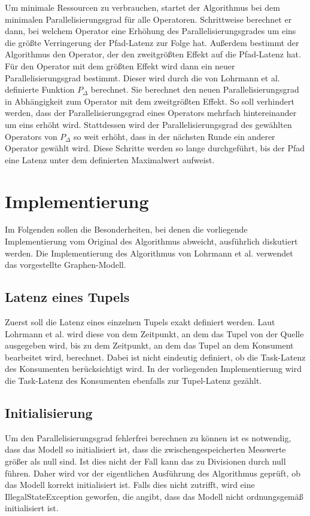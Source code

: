 Um minimale Ressourcen zu verbrauchen, startet der Algorithmus bei dem minimalen Parallelisierungsgrad für alle Operatoren.
Schrittweise berechnet er dann, bei welchem Operator eine Erhöhung des Parallelisierungsgrades um eins die größte Verringerung der Pfad-Latenz zur Folge hat.
Außerdem bestimmt der Algorithmus den Operator, der den zweitgrößten Effekt auf die Pfad-Latenz hat.
Für den Operator mit dem größten Effekt wird dann ein neuer Parallelisierungsgrad bestimmt.
Dieser wird durch die von Lohrmann et al. definierte Funktion \(P_\Delta\) berechnet.
Sie berechnet den neuen Parallelisierungsgrad in Abhängigkeit zum Operator mit dem zweitgrößten Effekt.
So soll verhindert werden, dass der Parallelisierungsgrad eines Operators mehrfach hintereinander um eins erhöht wird.
Stattdessen wird der Parallelisierungsgrad des gewählten Operators von \(P_\Delta\) so weit erhöht, dass in der nächsten Runde ein anderer Operator gewählt wird.
Diese Schritte werden so lange durchgeführt, bis der Pfad eine Latenz unter dem definierten Maximalwert aufweist.

\section{Implementierung}

Im Folgenden sollen die Besonderheiten, bei denen die vorliegende Implementierung vom Original des Algorithmus abweicht, ausführlich diskutiert werden.
Die Implementierung des Algorithmus von Lohrmann et al. verwendet das vorgestellte Graphen-Modell.

\subsection{Latenz eines Tupels}
Zuerst soll die Latenz eines einzelnen Tupels exakt definiert werden.
Laut Lohrmann et al. wird diese von dem Zeitpunkt, an dem das Tupel von der Quelle ausgegeben wird, bis zu dem Zeitpunkt, an dem das Tupel an dem Konsument bearbeitet wird, berechnet. 
Dabei ist nicht eindeutig definiert, ob die Task-Latenz des Konsumenten berücksichtigt wird. 
In der vorliegenden Implementierung wird die Task-Latenz des Konsumenten ebenfalls zur Tupel-Latenz gezählt.

\subsection{Initialisierung}
Um den Parallelisierungsgrad fehlerfrei berechnen zu können ist es notwendig, dass das Modell so initialisiert ist, dass die zwischengespeicherten Messwerte größer als null sind.
Ist dies nicht der Fall kann das zu Divisionen durch null führen.
Daher wird vor der eigentlichen Ausführung des Algorithmus geprüft, ob das Modell korrekt initialisiert ist.
Falls dies nicht zutrifft, wird eine IllegalStateException geworfen, die angibt, dass das Modell nicht ordnungsgemäß initialisiert ist.

